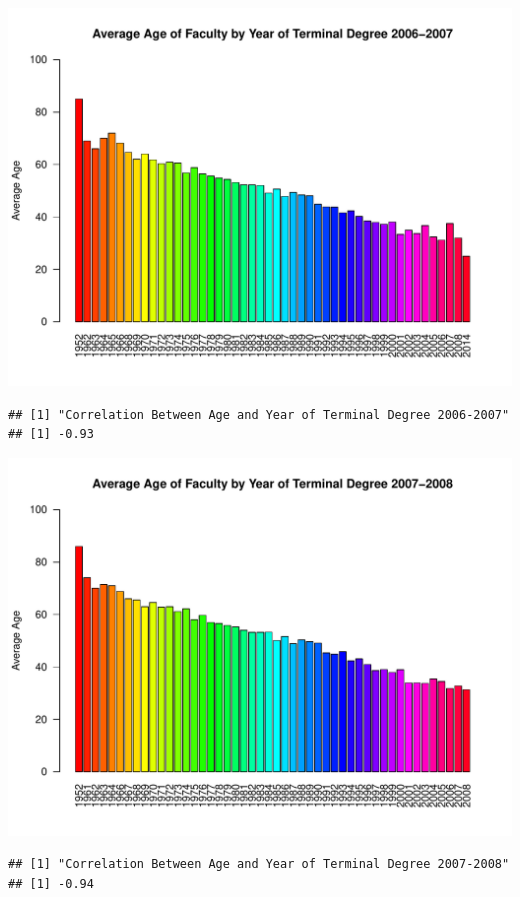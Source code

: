 \documentclass[12pt,a4paper]{article}\usepackage[]{graphicx}\usepackage[]{color}
\makeatletter
\def\maxwidth{ %
  \ifdim\Gin@nat@width>\linewidth
    \linewidth
  \else
    \Gin@nat@width
  \fi
}
\newenvironment{kframe}{%
 \def\at@end@of@kframe{}%
 \ifinner\ifhmode%
  \def\at@end@of@kframe{\end{minipage}}%
  \begin{minipage}{\columnwidth}%
 \fi\fi%
 \def\FrameCommand##1{\hskip\@totalleftmargin \hskip-\fboxsep
 \colorbox{shadecolor}{##1}\hskip-\fboxsep
     \hskip-\linewidth \hskip-\@totalleftmargin \hskip\columnwidth}%
 \MakeFramed {\advance\hsize-\width
   \@totalleftmargin\z@ \linewidth\hsize
   \@setminipage}}%
 {\par\unskip\endMakeFramed%
 \at@end@of@kframe}
\newenvironment{knitrout}{}{} %
\theoremstyle{definition}
\makeatother
\begin{document}
\begin{knitrout}
\begin{kframe}
\begin{verbatim}
\end{verbatim}
\end{kframe}
\includegraphics[width=\maxwidth]{figure/unnamed-chunk-11-3} 
\begin{kframe}\begin{verbatim}
## [1] "Correlation Between Age and Year of Terminal Degree 2006-2007"
## [1] -0.93
\end{verbatim}
\end{kframe}
\includegraphics[width=\maxwidth]{figure/unnamed-chunk-11-4} 
\begin{kframe}\begin{verbatim}
## [1] "Correlation Between Age and Year of Terminal Degree 2007-2008"
## [1] -0.94
\end{verbatim}

\end{kframe}
\end{knitrout}
\end{document}

